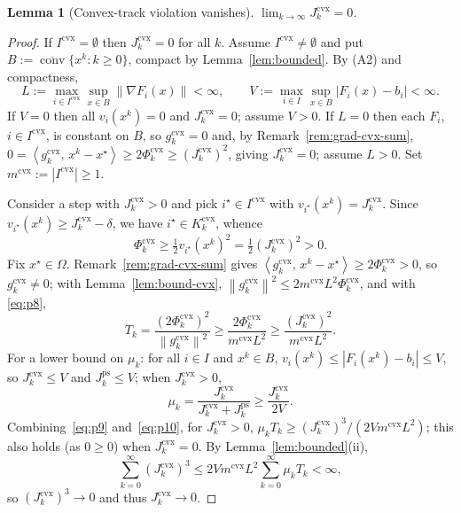 \documentclass[]{interact}
\theoremstyle{plain}
\newtheorem{lemma}[theorem]{Lemma}
\theoremstyle{definition}
\theoremstyle{remark}
\newcommand{\norm}[1]{\left\lVert #1 \right\rVert}
\newcommand{\abs}[1]{\left\lvert #1 \right\rvert}
\newcommand{\inner}[2]{\left\langle #1,\, #2 \right\rangle}
\DeclareMathOperator{\conv}{conv}
\newcommand{\cvx}{\mathrm{cvx}}
\newcommand{\ps}{\mathrm{ps}}
\begin{document}
\begin{lemma}[Convex-track violation vanishes]\label{lem:jcvx0}
$\displaystyle\lim_{k\to\infty}J^{\cvx}_k=0$.
\end{lemma}
\begin{proof}
If $I^{\cvx}=\emptyset$ then $J^{\cvx}_k=0$ for all $k$. Assume $I^{\cvx}\ne\emptyset$ and
put $B:=\overline{\conv}\{x^k:k\ge0\}$, compact by Lemma~\ref{lem:bounded}. By (A2) and
compactness,
\[
L:=\max_{i\in I^{\cvx}}\sup_{x\in B}\norm{\nabla F_i(x)}<\infty,\qquad
V:=\max_{i\in I}\sup_{x\in B}\abs{F_i(x)-b_i}<\infty.
\]
If $V=0$ then all $v_i(x^k)=0$ and
$J^{\cvx}_k=0$; assume $V>0$. If $L=0$ then each $F_i$, $i\in I^{\cvx}$, is constant on
$B$, so $g^{\cvx}_k=0$ and, by Remark~\ref{rem:grad-cvx-sum},
$0=\inner{g^{\cvx}_k}{x^k-x^\star}\ge 2\Phi^{\cvx}_k\ge(J^{\cvx}_k)^2$, giving
$J^{\cvx}_k=0$; assume $L>0$. Set $m^{\cvx}:=\abs{I^{\cvx}}\ge1$.

Consider a step with $J^{\cvx}_k>0$ and pick $i^\star\in I^{\cvx}$ with
$v_{i^\star}(x^k)=J^{\cvx}_k$. Since $v_{i^\star}(x^k)\ge J^{\cvx}_k-\delta$, we have
$i^\star\in K^{\cvx}_k$, whence
\begin{equation}\label{eq:p8}
\Phi^{\cvx}_k\ge\tfrac12 v_{i^\star}(x^k)^2=\tfrac12(J^{\cvx}_k)^2>0 .
\end{equation}
Fix $x^\star\in\Omega$. Remark~\ref{rem:grad-cvx-sum} gives
$\inner{g^{\cvx}_k}{x^k-x^\star}\ge2\Phi^{\cvx}_k>0$, so $g^{\cvx}_k\ne0$; with
Lemma~\ref{lem:bound-cvx}, $\norm{g^{\cvx}_k}^2\le2m^{\cvx}L^2\Phi^{\cvx}_k$, and with
\eqref{eq:p8},
\begin{equation}\label{eq:p9}
T_k=\frac{(2\Phi^{\cvx}_k)^2}{\norm{g^{\cvx}_k}^2}\ge\frac{2\Phi^{\cvx}_k}{m^{\cvx}L^2}\ge\frac{(J^{\cvx}_k)^2}{m^{\cvx}L^2}.
\end{equation}
For a lower bound on $\mu_k$: for all $i\in I$ and $x^k\in B$,
$v_i(x^k)\le\abs{F_i(x^k)-b_i}\le V$, so $J^{\cvx}_k\le V$ and $J^{\ps}_k\le V$; when
$J^{\cvx}_k>0$,
\begin{equation}\label{eq:p10}
\mu_k=\frac{J^{\cvx}_k}{J^{\cvx}_k+J^{\ps}_k}\ge\frac{J^{\cvx}_k}{2V}.
\end{equation}
Combining~\eqref{eq:p9} and~\eqref{eq:p10}, for $J^{\cvx}_k>0$,
$\mu_k T_k\ge(J^{\cvx}_k)^3/(2Vm^{\cvx}L^2)$; this also holds (as $0\ge0$) when
$J^{\cvx}_k=0$. By Lemma~\ref{lem:bounded}(ii),
\begin{equation}\label{eq:p12}
\sum_{k=0}^\infty(J^{\cvx}_k)^3\le 2Vm^{\cvx}L^2\sum_{k=0}^\infty\mu_k T_k<\infty,
\end{equation}
so $(J^{\cvx}_k)^3\to0$ and thus $J^{\cvx}_k\to0$.
\end{proof}
\end{document}
